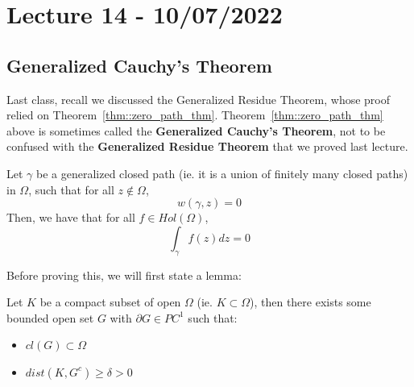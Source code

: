 \section{Lecture 14 - 10/07/2022}

\subsection{Generalized Cauchy's Theorem}

Last class, recall we discussed the Generalized Residue Theorem, whose proof relied on Theorem~\ref{thm::zero_path_thm}. 
 Theorem~\ref{thm::zero_path_thm} above is sometimes called the \textbf{Generalized Cauchy's Theorem}, not to be confused with the \textbf{Generalized Residue Theorem} that we proved last lecture.

\begin{theorem}
    Let $\gamma$ be a generalized closed path (ie. it is a union of finitely many closed paths) in $\Omega$, such that for all $z \notin \Omega$,
    \[w(\gamma, z) = 0\]
    Then, we have that for all $f \in Hol(\Omega)$,
    \[\int_\gamma f(z) dz = 0\]
\end{theorem}

Before proving this, we will first state a lemma:

\begin{lemma}
    Let $K$ be a compact subset of open $\Omega$ (ie. $K \subset \Omega$), then there exists some bounded open set $G$ with $\partial G \in PC^1$ such that:
    \begin{itemize}
        \item $cl(G) \subset \Omega$
        \item $dist(K, G^c) \geq \delta > 0$
    \end{itemize}
\end{lemma}

